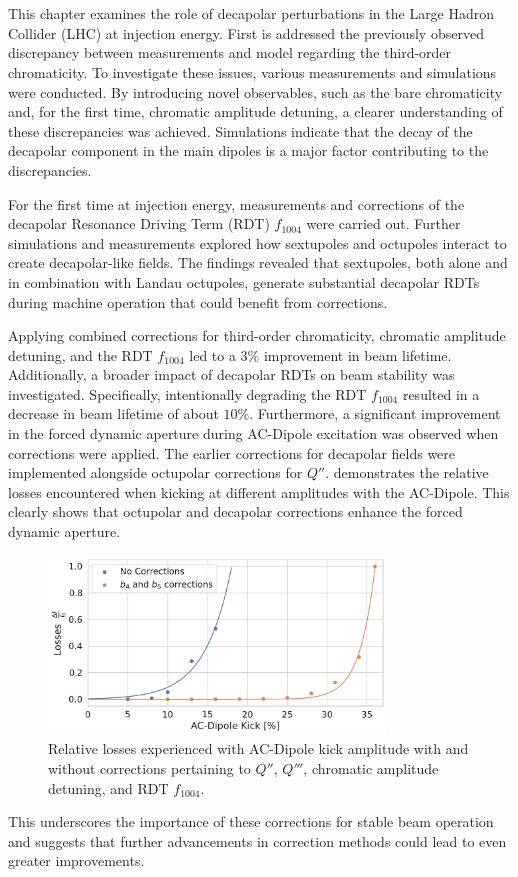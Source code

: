 \section{}

This chapter examines the role of decapolar perturbations in the Large Hadron Collider (LHC) at
injection energy. First is addressed the previously observed discrepancy between measurements and
model regarding the third-order chromaticity. To investigate these issues, various measurements and
simulations were conducted. By introducing novel observables, such as the bare chromaticity and, for
the first time, chromatic amplitude detuning, a clearer understanding of these discrepancies was
achieved. Simulations indicate that the decay of the decapolar component in the main dipoles is a
major factor contributing to the discrepancies.

For the first time at injection energy, measurements and corrections of the decapolar Resonance
Driving Term (RDT) $f_{1004}$ were carried out. Further simulations and measurements explored how
sextupoles and octupoles interact to create decapolar-like fields. The findings revealed that
sextupoles, both alone and in combination with Landau octupoles, generate substantial decapolar RDTs
during machine operation that could benefit from corrections.

Applying combined corrections for third-order chromaticity, chromatic amplitude detuning, and the
RDT $f_{1004}$ led to a $3\%$ improvement in beam lifetime. Additionally, a broader impact of
decapolar RDTs on beam stability was investigated. Specifically, intentionally degrading the RDT
$f_{1004}$ resulted in a decrease in beam lifetime of about $10\%$. 
Furthermore, a significant improvement in the forced dynamic aperture during AC-Dipole excitation
was observed when corrections were applied. The earlier corrections for decapolar fields were
implemented alongside octupolar corrections for $Q''$. 
demonstrates the relative losses encountered when kicking at different amplitudes with the
AC-Dipole. This clearly shows that octupolar and decapolar corrections enhance the forced dynamic
aperture.

\begin{figure}[!htb]
    \centering
    \includegraphics[width=0.8\textwidth]{./images/losses_with_without_b4b5corr.pdf}
    \caption{Relative losses experienced with AC-Dipole kick amplitude with and without corrections
    pertaining to $Q''$, $Q'''$, chromatic amplitude detuning, and RDT $f_{1004}$.}
    \label{fig:decapoles:losses_b4b5_corrs}
\end{figure}

This underscores the importance of these corrections for stable beam operation and suggests that
further advancements in correction methods could lead to even greater improvements. 